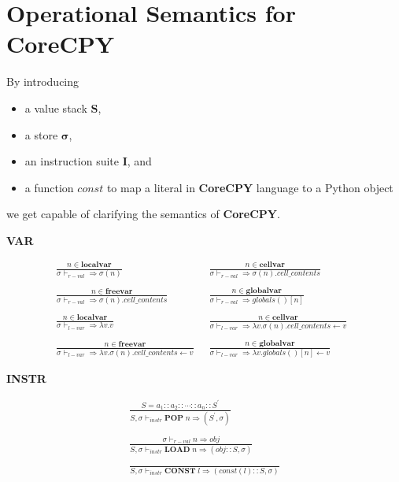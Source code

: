 \documentclass[12pt, a4paper]{report}
\newcommand{\rulegroup}[1]{
    \textbf{#1}
}
\begin{document}
\section* {Operational Semantics for \textbf{CoreCPY}}

By introducing 
\begin{itemize}
    \item a value stack $\mathbf{S}$,
    \item a store $\mathbf{\sigma}$,
    \item an instruction suite $\mathbf{I}$, and
    \item a function $const$ to map a literal in \textbf{CoreCPY} language to a Python object
\end{itemize}
we get capable of clarifying the semantics of \textbf{CoreCPY}.

\hrulefill

\rulegroup{VAR}

\begin{equation*}
\begin{split}
\frac{n \in \mathbf{localvar}}{\sigma \vdash_{r-val} \Rightarrow \sigma(n)}
& \;\;
\frac{n \in \mathbf{cellvar}}{\sigma \vdash_{r-val} \Rightarrow \sigma(n).cell\_contents}
\;\; \\ \\
\frac{n \in \mathbf{freevar}}{\sigma \vdash_{r-val} \Rightarrow \sigma(n).cell\_contents}
& \;\;
\frac{n \in \mathbf{globalvar}}{\sigma \vdash_{r-val} \Rightarrow globals()[n]}
\\
\\
\frac{n \in \mathbf{localvar}}{\sigma \vdash_{l-var} \Rightarrow \lambda v . v}
& \;\;
\frac{n \in \mathbf{cellvar}}{\sigma \vdash_{l-var} \Rightarrow \lambda v . \sigma(n).cell\_contents \leftarrow v}
\;\; \\ \\
\frac{n \in \mathbf{freevar}}{\sigma \vdash_{l-var} \Rightarrow \lambda v . \sigma(n).cell\_contents \leftarrow v}
& \;\;
\frac{n \in \mathbf{globalvar}}{\sigma \vdash_{l-var} \Rightarrow \lambda v. globals()[n] \leftarrow v}
\end{split}
\end{equation*}

\hrulefill

\bigbreak

\rulegroup{INSTR}

\begin{equation*}
\begin{split}
\frac{
    S = a_1 :: a_2 :: \cdots :: a_n :: S^{'}
}{
    S, \sigma \vdash_{instr} \mathbf{POP}\;n \Rightarrow (S^{'}, \sigma)
}
\\
\\
\frac{\sigma \vdash_{r-val} n \Rightarrow obj}
     {S, \sigma \vdash_{instr} \mathbf{LOAD}\; n \Rightarrow (obj :: S, \sigma)}
\\
\\
\frac{}
     {S, \sigma \vdash_{instr} \mathbf{CONST}\; l \Rightarrow (const(l) :: S, \sigma)}
\end{split}
\end{equation*}
\end{document}
